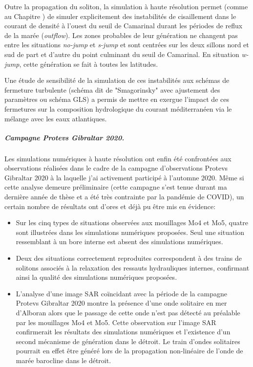 Outre la propagation du soliton, la simulation à haute résolution permet (comme au Chapitre ) de simuler explicitement des instabilités de cisaillement dans le courant de densité à l'ouest du seuil de Camarinal durant les périodes de reflux de la marée (\textit{outflow}). Les zones probables de leur génération ne changent pas entre les situations \textit{no-jump} et \textit{s-jump} et sont centrées sur les deux sillons nord et sud de part et d'autre du point culminant du seuil de Camarinal. En situation \textit{w-jump}, cette génération se fait à toutes les latitudes.

Une étude de sensibilité de la simulation de ces instabilités aux schémas de fermeture turbulente (schéma dit de "Smagorinsky" avec ajustement des paramètres ou schéma GLS) a permis de mettre en exergue l'impact de ces fermetures sur la composition hydrologique du courant méditerranéen via le mélange avec les eaux atlantiques.

\subparagraph{Campagne Protevs Gibraltar 2020.}
Les simulations numériques à haute résolution ont enfin été confrontées aux observations réalisées dans le cadre de la campagne d'observations Protevs Gibraltar 2020 à la laquelle j'ai activement participé à l'automne 2020. Même si cette analyse demeure préliminaire (cette campagne s'est tenue durant ma dernière année de thèse et a été très contrainte par la pandémie de COVID), un certain nombre de résultats ont d'ores et déjà pu être mis en évidence:
\begin{itemize}
    \item Sur les cinq types de situations observées aux mouillages Mo4 et Mo5, quatre sont illustrées dans les simulations numériques proposées. Seul une situation ressemblant à un bore interne est absent des simulations numériques.
    \item Deux des situations correctement reproduites correspondent à des trains de solitons associés à la relaxation des ressauts hydrauliques internes, confirmant ainsi la qualité des simulations numériques proposées.
    \item L'analyse d'une image SAR coïncidant avec la période de la campagne Protevs Gibraltar 2020 montre la présence d'une onde solitaire en mer d'Alboran alors que le passage de cette onde n'est pas détecté au préalable par les mouillages Mo4 et Mo5. Cette observation sur l'image SAR confirmerait les résultats des simulations numériques et l'existence d'un second mécanisme de génération dans le détroit. Le train d'ondes solitaires pourrait en effet être généré lors de la propagation non-linéaire de l'onde de marée barocline dans le détroit.
\end{itemize}

